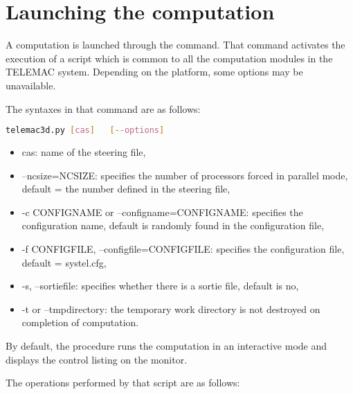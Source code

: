 \chapter{Launching the computation}

A computation is launched through the  command. That command
activates the execution of a script which is common to all the computation
modules in the TELEMAC system. Depending on the platform, some options may be
unavailable.

The syntaxes in that command are as follows:

\begin{lstlisting}[language=bash]
telemac3d.py [cas]   [--options]
\end{lstlisting}

\begin{itemize}
\item cas: name of the steering file,

\item --ncsize=NCSIZE: specifies the number of processors forced in parallel
mode, default = the number defined in the steering file,

\item -c CONFIGNAME or --configname=CONFIGNAME: specifies the configuration
name, default is randomly found in the configuration file,

\item -f CONFIGFILE, --configfile=CONFIGFILE: specifies the configuration
file, default = systel.cfg,

\item -s, --sortiefile: specifies whether there is a sortie file, default is
no,

\item -t or --tmpdirectory: the temporary work directory is not destroyed on
completion of computation.
\end{itemize}

By default, the procedure runs the computation in an interactive mode and
displays the control listing on the monitor.

The operations performed by that script are as follows:

